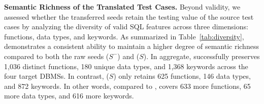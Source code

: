 \documentclass[sigconf,review,anonymous]{acmart}
\begin{document}
\textbf{Semantic Richness of the Translated Test Cases.}
Beyond validity, we assessed whether the transferred seeds retain the testing value of the source test cases by analyzing the diversity of valid SQL features across three dimensions: functions, data types, and keywords. 
As summarized in Table~\ref{tab:diversity}, \tool{} demonstrates a consistent ability to maintain a higher degree of semantic richness compared to both the raw seeds ($S^-$) and \sedar{} ($S$). 
In aggregate, \tool{} successfully preserves 1,036 distinct functions, 180 unique data types, and 1,368 keywords across the four target DBMSs. 
In contrast, \sedar{} ($S$) only retains 625 functions, 146 data types, and 872 keywords. 
In other words, compared to \sedar, \tool{} covers 633 more functions, 65 more data types, and 616 more keywords.


\begin{table}[ht]
\centering %
\small     %
\caption{Statistics of valid SQL features (Functions, Data Types, Keywords) in the transferred seeds.}
\label{tab:diversity}
\renewcommand\arraystretch{1}
\end{table}
\end{document}
